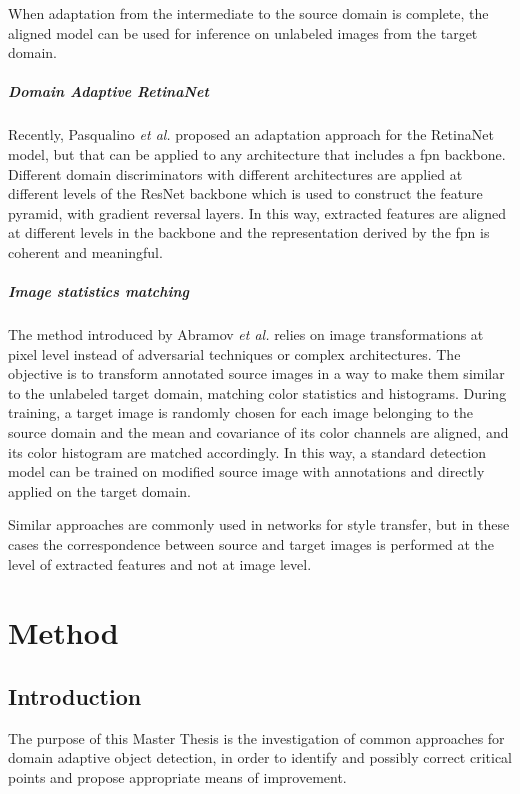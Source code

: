 \documentclass[%
    corpo=12pt,
    twoside,
    stile=classica,   
    tipotesi=magistrale,
    evenboxes,
    english,
	numerazioneromana,
]{toptesi}
\begin{document}
When adaptation from the intermediate to the source domain is complete, the aligned model can be used for inference on unlabeled images from the target domain.

\paragraph{Domain Adaptive RetinaNet}\label{sec:daretinanet}
Recently, Pasqualino \emph{et al.}\cite{pasqualino2020unsupervised} proposed an adaptation approach for the RetinaNet model, but that can be applied to any architecture that includes a \gls{fpn} backbone. Different domain discriminators with different architectures are applied at different levels of the ResNet backbone which is used to construct the feature pyramid, with gradient reversal layers. In this way, extracted features are aligned at different levels in the backbone and the representation derived by the \gls{fpn} is coherent and meaningful.

\paragraph{Image statistics matching}\label{sec:kis}
The method introduced by Abramov \emph{et al.}\cite{abramov2020simple} relies on image transformations at pixel level instead of adversarial techniques or complex architectures. The objective is to transform annotated source images in a way to make them similar to the unlabeled target domain, matching color statistics and histograms. During training, a target image is randomly chosen for each image belonging to the source domain and the mean and covariance of its color channels are aligned, and its color histogram are matched accordingly. In this way, a standard detection model can be trained on modified source image with annotations and directly applied on the target domain.

Similar approaches are commonly used in networks for style transfer, but in these cases the correspondence between source and target images is performed at the level of extracted features and not at image level.



\chapter{Method}
\section{Introduction}
The purpose of this Master Thesis is the investigation of common approaches for domain adaptive object detection, in order to identify and possibly correct critical points and propose appropriate means of improvement.
\end{document}
